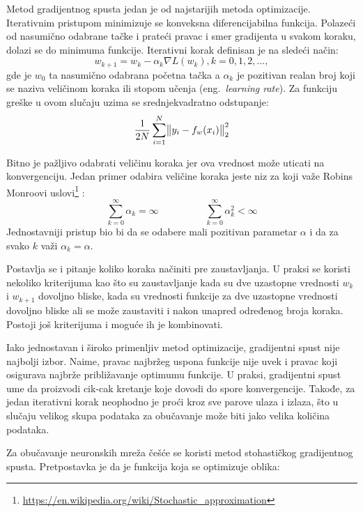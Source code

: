 Metod gradijentnog spusta jedan je od najstarijih metoda  optimizacije. Iterativnim pristupom minimizuje se konveksna diferencijabilna funkcija. Polazeći od nasumično odabrane tačke i prateći pravac i smer gradijenta u svakom koraku, dolazi se do minimuma funkcije. Iterativni korak definisan je na sledeći način:
\begin{equation}
	\label{eq:gradijentni_spust}
	w_{k+1} = w_k - \alpha_k \nabla L(w_k), k=0, 1, 2, ... ,
\end{equation}
gde je $w_0$ ta nasumično odabrana početna tačka a $\alpha_k$ je pozitivan realan broj koji se naziva veličinom koraka ili stopom učenja (eng.~{\em learning rate}). 
Za funkciju greške u ovom slučaju uzima se srednjekvadratno odstupanje:
\begin{equation}
	\frac{1}{2N}\sum_{i=1}^{N} \norm{y_i - f_w(x_i)}_2^2
\end{equation}

Bitno je pažljivo odabrati veličinu koraka jer ova vrednost može uticati na konvergenciju. Jedan primer odabira veličine koraka jeste niz za koji važe Robins Monroovi uslovi\footnote{\url{https://en.wikipedia.org/wiki/Stochastic_approximation}} :
\begin{equation}
	 \sum_{k=0}^{\infty} \alpha_k = \infty \hspace{2cm} \sum_{k=0}^{\infty} \alpha_k^2 < \infty 
	\end{equation}
Jednostavniji pristup bio bi da se odabere mali pozitivan parametar $\alpha$ i da za svako $k$ važi $\alpha_k = \alpha$.
\par
Postavlja se i pitanje koliko koraka načiniti pre zaustavljanja. U praksi se koristi nekoliko kriterijuma kao što su zaustavljanje kada su dve uzastopne vrednosti $w_k$ i $w_{k+1}$ dovoljno bliske, kada su vrednosti funkcije za dve uzastopne vrednosti dovoljno bliske ali se može zaustaviti i nakon unapred određenog broja koraka. Postoji još kriterijuma i moguće ih je kombinovati.
\par
Iako jednostavan i široko primenljiv metod optimizacije, gradijentni spust nije najbolji izbor. Naime, pravac najbržeg uspona funkcije nije uvek i pravac koji osigurava najbrže približavanje optimumu funkcije. U praksi, gradijentni spust ume da proizvodi cik-cak kretanje koje dovodi do spore konvergencije. Takođe, za jedan iterativni korak neophodno je proći kroz sve parove ulaza i izlaza, što u slučaju velikog skupa podataka za obučavanje može biti jako velika količina podataka.
\par
Za obučavanje neuronskih mreža češće se koristi metod stohastičkog gradijentnog spusta. Pretpostavka je da je funkcija koja se optimizuje oblika:

